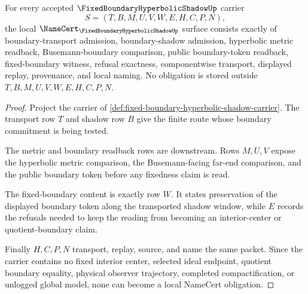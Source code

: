 \begin{theorem}
\label{thm:fixed-boundary-hyperbolic-shadow-namecert-obligations}
For every accepted $\FixedBoundaryHyperbolicShadowUp$ carrier
$$
S=(T,B,M,U,V,W,E,H,C,P,N),
$$
the local $\NameCert_{\FixedBoundaryHyperbolicShadowUp}$ surface consists exactly of boundary-transport admission, boundary-shadow admission, hyperbolic metric readback, Busemann-boundary comparison, public boundary-token readback, fixed-boundary witness, refusal exactness, componentwise transport, displayed replay, provenance, and local naming. No obligation is stored outside $T,B,M,U,V,W,E,H,C,P,N$.
\end{theorem}
\begin{proof}
Project the carrier of \autoref{def:fixed-boundary-hyperbolic-shadow-carrier}. The transport row $T$ and shadow row $B$ give the finite route whose boundary commitment is being tested.

The metric and boundary readback rows are downstream. Rows $M,U,V$ expose the hyperbolic metric comparison, the Busemann-facing far-end comparison, and the public boundary token before any fixedness claim is read.

The fixed-boundary content is exactly row $W$. It states preservation of the displayed boundary token along the transported shadow window, while $E$ records the refusals needed to keep the reading from becoming an interior-center or quotient-boundary claim.

Finally $H,C,P,N$ transport, replay, source, and name the same packet. Since the carrier contains no fixed interior center, selected ideal endpoint, quotient boundary equality, physical observer trajectory, completed compactification, or unlogged global model, none can become a local NameCert obligation.
\end{proof}

